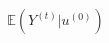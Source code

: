 \documentclass[preview]{standalone}
\begin{document}
\begin{align*}
\mathbb{E}(Y^{(t)} | u^{(0)})
\end{align*}
\end{document}
